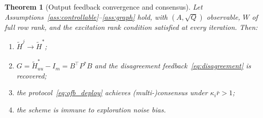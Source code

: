 \documentclass[final,5p,times]{elsarticle}
\theoremstyle{plain}
\newtheorem{theorem}{Theorem}
\theoremstyle{definition}
\theoremstyle{remark}
\begin{document}
\begin{theorem}[Output feedback convergence and consensus]
\label{thm:ofb_convergence}
Let Assumptions~\ref{ass:controllable}--\ref{ass:graph} hold, with $(A, \sqrt{Q})$ observable, $W$ of full row rank, and the excitation rank condition satisfied at every iteration. Then:
\begin{enumerate}
\item[(i)] $\tilde{H}^j \to \tilde{H}^*$;
\item[(ii)] $G = \tilde{H}_{uu}^* - I_m = B^\top P^*B$ and the disagreement feedback~\eqref{eq:disagreement} is recovered;
\item[(iii)] the protocol~\eqref{eq:ofb_deploy} achieves (multi-)consensus under $\kappa_i \bar{r} > 1$;
\item[(iv)] the scheme is immune to exploration noise bias.
\end{enumerate}
\end{theorem}
\end{document}
